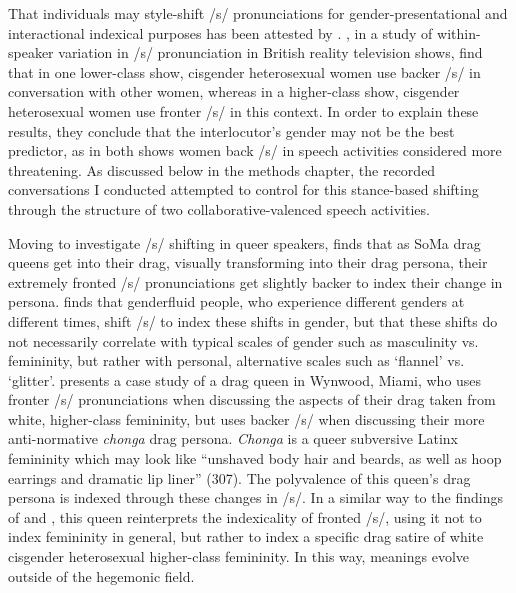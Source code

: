 \documentclass[12pt,twoside]{reedthesis}
\begin{document}
That individuals may style-shift /s/ pronunciations for gender-presentational and interactional indexical purposes has been attested by \textcite{benesch_stylizing_2022, mendoza_that_2024, saigusa_jane_2016, holmes-elliott_substance_2017, levon_east_2013, parnell-mooney_transgender_2019, calder_fierceness_2019, zimman_variability_2017}. \textcite{holmes-elliott_substance_2017, levon_east_2013}, in a study of within-speaker variation in /s/ pronunciation in British reality television shows, find that in one lower-class show, cisgender heterosexual women use backer /s/ in conversation with other women, whereas in a higher-class show, cisgender heterosexual women use fronter /s/ in this context. In order to explain these results, they conclude that the interlocutor's gender may not be the best predictor, as in both shows women back /s/ in speech activities considered more threatening. As discussed below in the methods chapter, the recorded conversations I conducted attempted to control for this stance-based shifting through the structure of two collaborative-valenced speech activities.

Moving to investigate /s/ shifting in queer speakers, \textcite{calder_fierceness_2019} finds that as SoMa drag queens get into their drag, visually transforming into their drag persona, their extremely fronted /s/ pronunciations get slightly backer to index their change in persona. \textcite{benesch_stylizing_2022} finds that genderfluid people, who experience different genders at different times, shift /s/ to index these shifts in gender, but that these shifts do not necessarily correlate with typical scales of gender such as masculinity vs. femininity, but rather with personal, alternative scales such as `flannel' vs. `glitter'. \textcite{mendoza_that_2024} presents a case study of a drag queen in Wynwood, Miami, who uses fronter /s/ pronunciations when discussing the aspects of their drag taken from white, higher-class femininity, but uses backer /s/ when discussing their more anti-normative \textit{chonga} drag persona. \textit{Chonga} is a queer subversive Latinx femininity which may look like ``unshaved body hair and beards, as well as hoop earrings and dramatic lip liner'' (307). The polyvalence of this queen's drag persona is indexed through these changes in /s/. In a similar way to the findings of \textcite{calder_fierceness_2019} and \textcite{steele_enacting_2022}, this queen reinterprets the indexicality of fronted /s/, using it not to index femininity in general, but rather to index a specific drag satire of white cisgender heterosexual higher-class femininity. In this way, meanings evolve outside of the hegemonic field.
\end{document}
